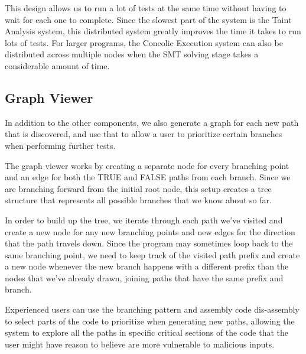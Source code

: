 This design allows us to run a lot of tests at the same time without having to
wait for each one to complete. Since the slowest part of the system is the Taint
Analysis system, this distributed system greatly improves the time it takes to
run lots of tests. For larger programs, the Concolic Execution system can also
be distributed across multiple nodes when the SMT solving stage takes a
considerable amount of time.

\subsection{Graph Viewer}
In addition to the other components, we also generate a graph for each new path
that is discovered, and use that to allow a user to prioritize certain branches
when performing further tests.

The graph viewer works by creating a separate node for every branching point and
an edge for both the TRUE and FALSE paths from each branch. Since we are
branching forward from the initial root node, this setup creates a tree
structure that represents all possible branches that we know about so far.

In order to build up the tree, we iterate through each path we've visited and
create a new node for any new branching points and new edges for the direction
that the path travels down. Since the program may sometimes loop back to the
same branching point, we need to keep track of the visited path prefix and
create a new node whenever the new branch happens with a different prefix than
the nodes that we've already drawn, joining paths that have the same prefix and
branch.

Experienced users can use the branching pattern and assembly code dis-assembly to
select parts of the code to prioritize when generating new paths, allowing the
system to explore all the paths in specific critical sections of the code that
the user might have reason to believe are more vulnerable to malicious inputs.

